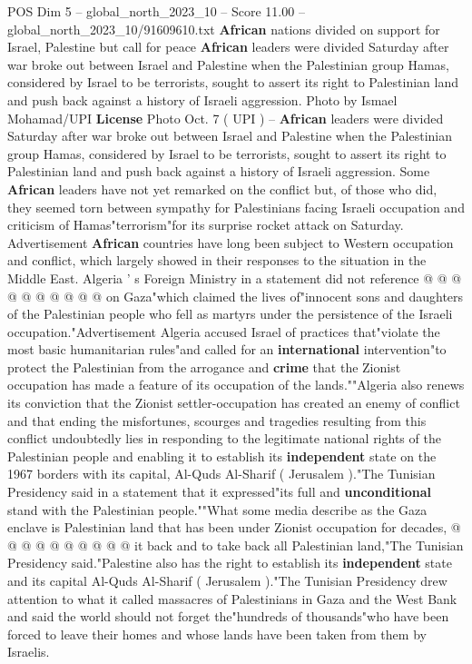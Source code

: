 \begin{textsample}{POS Dim 5 – global\_north\_2023\_10 – Score 11.00 – global\_north\_2023\_10/91609610.txt}  \label{ex:f5_pos_426}
\textbf{African} nations divided on support for Israel, Palestine but call for peace \textbf{African} leaders were divided Saturday after war broke out between Israel and Palestine when the Palestinian group Hamas, considered by Israel to be terrorists, sought to assert its right to Palestinian land and push back against a history of Israeli aggression.
Photo by Ismael Mohamad/UPI \textbf{License} Photo Oct. 7 ( UPI ) -- \textbf{African} leaders were divided Saturday after war broke out between Israel and Palestine when the Palestinian group Hamas, considered by Israel to be terrorists, sought to assert its right to Palestinian land and push back against a history of Israeli aggression.
Some \textbf{African} leaders have not yet remarked on the conflict but, of those who did, they seemed torn between sympathy for Palestinians facing Israeli occupation and criticism of Hamas"terrorism"for its surprise rocket attack on Saturday.
Advertisement \textbf{African} countries have long been subject to Western occupation and conflict, which largely showed in their responses to the situation in the Middle East.
Algeria ' s Foreign Ministry in a statement did not reference @ @ @ @ @ @ @ @ @ @ on Gaza"which claimed the lives of"innocent sons and daughters of the Palestinian people who fell as martyrs under the persistence of the Israeli occupation."Advertisement Algeria accused Israel of practices that"violate the most basic humanitarian rules"and called for an \textbf{international} intervention"to protect the Palestinian from the arrogance and \textbf{crime} that the Zionist occupation has made a feature of its occupation of the lands.""Algeria also renews its conviction that the Zionist settler-occupation has created an enemy of conflict and that ending the misfortunes, scourges and tragedies resulting from this conflict undoubtedly lies in responding to the legitimate national rights of the Palestinian people and enabling it to establish its \textbf{independent} state on the 1967 borders with its capital, Al-Quds Al-Sharif ( Jerusalem )."The Tunisian Presidency said in a statement that it expressed"its full and \textbf{unconditional} stand with the Palestinian people.""What some media describe as the Gaza enclave is Palestinian land that has been under Zionist occupation for decades, @ @ @ @ @ @ @ @ @ @ it back and to take back all Palestinian land,"The Tunisian Presidency said."Palestine also has the right to establish its \textbf{independent} state and its capital Al-Quds Al-Sharif ( Jerusalem )."The Tunisian Presidency drew attention to what it called massacres of Palestinians in Gaza and the West Bank and said the world should not forget the"hundreds of thousands"who have been forced to leave their homes and whose lands have been taken from them by Israelis.

\end{textsample}
